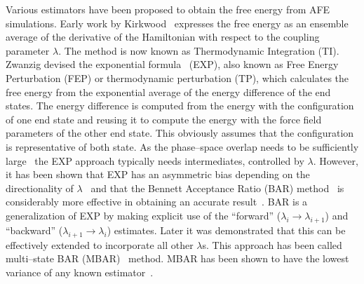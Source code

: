 \documentclass[journal=jctcce,manuscript=article]{achemso}
\begin{document}
Various estimators have been proposed to obtain the free energy from AFE 
simulations.  Early work by Kirkwood~\cite{kirkwood_statistical_1935} expresses 
the free energy as an ensemble average of the derivative of the
Hamiltonian with respect to the coupling parameter $\lambda$.  The
method is now known as Thermodynamic Integration (TI).  Zwanzig
devised the exponential formula~\cite{zwanzig_high-temperature_1954}
(EXP), also known as Free Energy Perturbation (FEP) or thermodynamic
perturbation (TP), which calculates the free energy from the
exponential average of the energy difference of the end states.  The
energy difference is computed from the energy with the configuration of one end 
state and reusing it to compute the energy with the force field parameters of 
the other end state.  This obviously assumes that the configuration is
representative of both state.  As the phase--space overlap needs to
be sufficiently large~\cite{wu_phase-space_2005,
  wu_phase-space_2005-1} the EXP approach typically needs
intermediates, controlled by $\lambda$.  However, it has been shown
that EXP has an asymmetric bias depending on the directionality of
$\lambda$~\cite{wu_asymmetric_2004} and that the Bennett Acceptance
Ratio (BAR) method~\cite{bennett_efficient_1976} is considerably more
effective in obtaining an accurate result~\cite{lu_appropriate_2003}.
BAR is a generalization of EXP by making explicit use of the
``forward'' ($\lambda_i \rightarrow \lambda_{i+1}$) and ``backward''
($\lambda_{i+1} \rightarrow \lambda_i$) estimates.  Later it was
demonstrated that this can be effectively extended to incorporate all
other $\lambda$s.  This approach has been called multi--state BAR
(MBAR)~\cite{shirts_statistically_2008-1} method.  MBAR has been shown
to have the lowest variance of any known
estimator~\cite{shirts_statistically_2008}.
\end{document}
